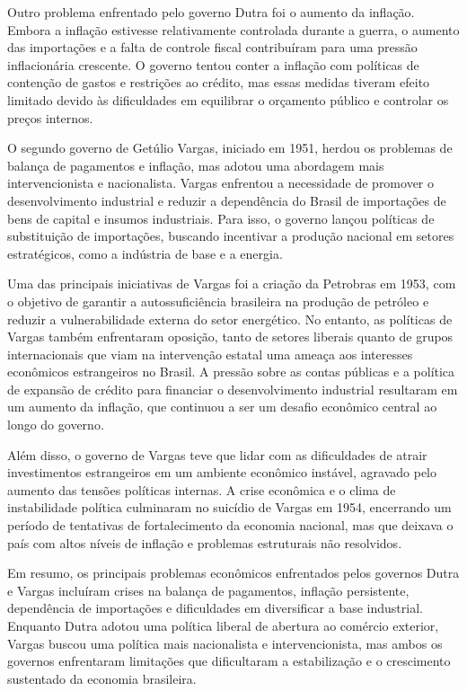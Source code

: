 \documentclass[a4paper,12pt]{article}[abntex2]
\begin{document}
Outro problema enfrentado pelo governo Dutra foi o aumento da inflação. Embora a inflação estivesse relativamente controlada durante a guerra, o aumento das importações e a falta de controle fiscal contribuíram para uma pressão inflacionária crescente. O governo tentou conter a inflação com políticas de contenção de gastos e restrições ao crédito, mas essas medidas tiveram efeito limitado devido às dificuldades em equilibrar o orçamento público e controlar os preços internos.

O segundo governo de Getúlio Vargas, iniciado em 1951, herdou os problemas de balança de pagamentos e inflação, mas adotou uma abordagem mais intervencionista e nacionalista. Vargas enfrentou a necessidade de promover o desenvolvimento industrial e reduzir a dependência do Brasil de importações de bens de capital e insumos industriais. Para isso, o governo lançou políticas de substituição de importações, buscando incentivar a produção nacional em setores estratégicos, como a indústria de base e a energia.

Uma das principais iniciativas de Vargas foi a criação da Petrobras em 1953, com o objetivo de garantir a autossuficiência brasileira na produção de petróleo e reduzir a vulnerabilidade externa do setor energético. No entanto, as políticas de Vargas também enfrentaram oposição, tanto de setores liberais quanto de grupos internacionais que viam na intervenção estatal uma ameaça aos interesses econômicos estrangeiros no Brasil. A pressão sobre as contas públicas e a política de expansão de crédito para financiar o desenvolvimento industrial resultaram em um aumento da inflação, que continuou a ser um desafio econômico central ao longo do governo.

Além disso, o governo de Vargas teve que lidar com as dificuldades de atrair investimentos estrangeiros em um ambiente econômico instável, agravado pelo aumento das tensões políticas internas. A crise econômica e o clima de instabilidade política culminaram no suicídio de Vargas em 1954, encerrando um período de tentativas de fortalecimento da economia nacional, mas que deixava o país com altos níveis de inflação e problemas estruturais não resolvidos.

Em resumo, os principais problemas econômicos enfrentados pelos governos Dutra e Vargas incluíram crises na balança de pagamentos, inflação persistente, dependência de importações e dificuldades em diversificar a base industrial. Enquanto Dutra adotou uma política liberal de abertura ao comércio exterior, Vargas buscou uma política mais nacionalista e intervencionista, mas ambos os governos enfrentaram limitações que dificultaram a estabilização e o crescimento sustentado da economia brasileira.
\end{document}
